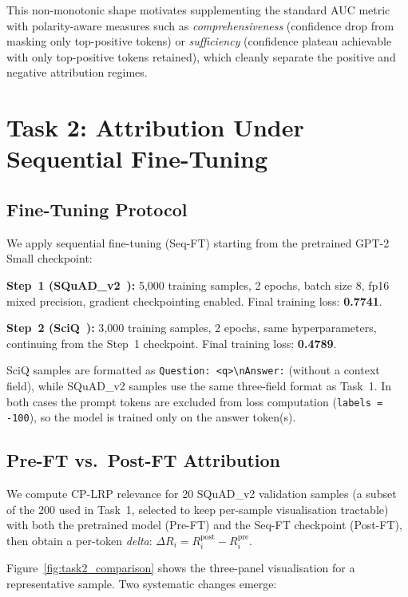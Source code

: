 \documentclass[10pt,twocolumn,letterpaper]{article}
\begin{document}
This non-monotonic shape motivates supplementing the standard AUC metric with
polarity-aware measures such as \emph{comprehensiveness} (confidence drop from
masking only top-positive tokens) or \emph{sufficiency} (confidence plateau
achievable with only top-positive tokens retained), which cleanly separate the
positive and negative attribution regimes.

\section{Task 2: Attribution Under Sequential Fine-Tuning}
\label{sec:task2}

\subsection{Fine-Tuning Protocol}

We apply sequential fine-tuning (Seq-FT) starting from the pretrained GPT-2
Small checkpoint:

\textbf{Step~1 (SQuAD\_v2~\cite{rajpurkar2018squad2}):} 5{,}000 training samples, 2 epochs,
batch size 8, fp16 mixed precision, gradient checkpointing enabled.
Final training loss: \textbf{0.7741}.

\textbf{Step~2 (SciQ~\cite{welbl2017sciq}):} 3{,}000 training samples, 2 epochs, same
hyperparameters, continuing from the Step~1 checkpoint.
Final training loss: \textbf{0.4789}.

SciQ samples are formatted as \texttt{Question: <q>\textbackslash nAnswer:}
(without a context field), while SQuAD\_v2 samples use the same three-field
format as Task~1.
In both cases the prompt tokens are excluded from loss computation
(\texttt{labels = -100}), so the model is trained only on the answer token(s).

\subsection{Pre-FT vs.\ Post-FT Attribution}

We compute CP-LRP relevance for 20 SQuAD\_v2 validation samples (a subset of
the 200 used in Task~1, selected to keep per-sample visualisation tractable)
with both the pretrained model (Pre-FT) and the Seq-FT checkpoint (Post-FT), then
obtain a per-token \emph{delta}:
$\Delta R_i = R_i^{\text{post}} - R_i^{\text{pre}}$.

Figure~\ref{fig:task2_comparison} shows the three-panel visualisation for a
representative sample.
Two systematic changes emerge:
\end{document}
